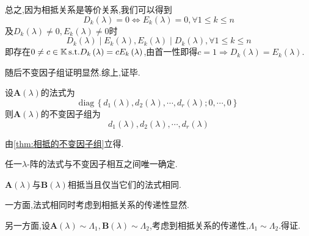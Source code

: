 \begin{formal}
\begin{Proof}
总之,因为相抵关系是等价关系,我们可以得到
\[
D_k\left(\lambda\right)=0\Longleftrightarrow
E_k\left(\lambda\right)=0,\forall 1\leqslant k\leqslant n
\]及$D_k\left(\lambda\right)\neq 0,E_k\left(\lambda\right)\neq 0$时
\[
D_k\left(\lambda\right)\mid E_k\left(\lambda\right),E_k\left(\lambda\right)\mid D_k\left(\lambda\right),\forall 1\leqslant k\leqslant n
\]即存在$0\neq c\in\mathbb{K}\,\textup{s.t.}D_k\left(\lambda\right)=cE_k\left(\lambda\right)$,由首一性即得$c=1\Longrightarrow
D_k\left(\lambda\right)=E_k\left(\lambda\right)$.

随后不变因子组证明显然.综上,证毕.
\end{Proof}
\end{formal}
\begin{formal}
\begin{theorem}[法式导出的不变因子组]\label{thm:法式导出的不变因子组}
    设$\bm{A}\left(\lambda\right)$的法式为
    \[
    \mathrm{diag}\,\left\{
        d_1\left(\lambda\right),d_2\left(\lambda\right),\cdots,d_r\left(\lambda\right);0,\cdots,0
    \right\}
    \]则$\bm{A}\left(\lambda\right)$的不变因子组为
    \[
   d_1\left(\lambda\right),d_2\left(\lambda\right),\cdots,d_r\left(\lambda\right)
    \]
\end{theorem}
\begin{Proof}
由\cref{thm:相抵的不变因子组}立得.
\end{Proof}
\end{formal}
\begin{green}
\begin{corollary}[唯一确定]\label{cor:唯一确定}
    任一$\lambda$-阵的法式与不变因子相互之间唯一确定.
\end{corollary}
\end{green}
\begin{green}
\begin{corollary}[相抵与不变因子、法式]\label{cor:相抵与不变因子、法式}
    $\bm{A}\left(\lambda\right)$与$\bm{B}\left(\lambda\right)$相抵当且仅当它们的法式相同.
\end{corollary}
\begin{Proof}
一方面,法式相同时考虑到相抵关系的传递性显然.

另一方面,设$\bm{A}\left(\lambda\right)\sim \bm{\varLambda}_1,\bm{B}\left(\lambda\right)\sim\bm{\varLambda}_2$,考虑到相抵关系的传递性,$\bm{\varLambda}_1\sim\bm{\varLambda}_2$.得证.
\end{Proof}
\end{green}
